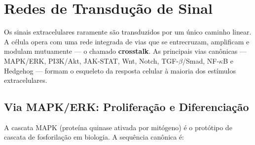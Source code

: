 \section{Redes de Transdução de Sinal}
\label{sec:09-transducao}

Os sinais extracelulares raramente são transduzidos por um único caminho linear.
A célula opera com uma rede integrada de vias que se entrecruzam, amplificam e
modulam mutuamente --- o chamado \textbf{crosstalk}. As principais vias
canônicas --- MAPK/ERK, PI3K/Akt, JAK-STAT, Wnt, Notch, TGF-$\beta$/Smad, NF-$\kappa$B
e Hedgehog --- formam o esqueleto da resposta celular à maioria dos estímulos
extracelulares.

\subsection{Via MAPK/ERK: Proliferação e Diferenciação}
\label{subsec:09-mapk}

A cascata MAPK (proteína quinase ativada por mitógeno) é o protótipo de cascata
de fosforilação em biologia. A sequência canônica é:

